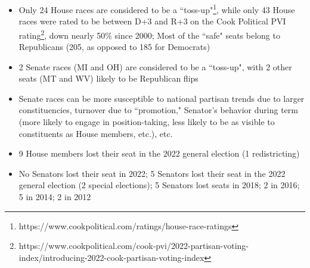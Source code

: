 \documentclass[10pt]{article}
\begin{document}
\begin{itemize}
    \item Only 24 House races are considered to be a ``toss-up"\footnote{https://www.cookpolitical.com/ratings/house-race-ratings}, while only 43 House races were rated to be between D+3 and R+3 on the Cook Political PVI rating\footnote{https://www.cookpolitical.com/cook-pvi/2022-partisan-voting-index/introducing-2022-cook-partisan-voting-index}, down nearly 50\% since 2000; Most of the ``safe" seats belong to Republicans (205, as opposed to 185 for Democrats)
    \item 2 Senate races (MI and OH) are considered to be a ``toss-up", with 2 other seats (MT and WV) likely to be Republican flips
    \item Senate races can be more susceptible to national partisan trends due to larger constituencies, turnover due to ``promotion," Senator's behavior during term (more likely to engage in position-taking, less likely to be as visible to constituents as House members, etc.), etc.
    \item 9 House members lost their seat in the 2022 general election (1 redistricting)
    \item No Senators lost their seat in 2022; 5 Senators lost their seat in the 2022 general election (2 special elections); 5 Senators lost seats in 2018; 2 in 2016; 5 in 2014;  2 in 2012
\end{itemize}
\end{document}
